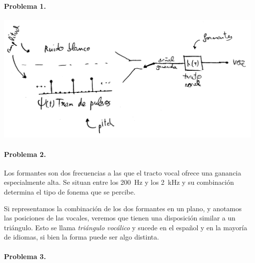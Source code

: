 

\newcommand{\nodenamebit}[1]{\textsf{#1}}
\newcommand{\nodenamesingle}[2]{\textsf{#1}_\textsf{#2}}
\newcommand{\nodenamerange}[3]{\textsf{#1}_\textsf{#2..#3}}


\startpage

\paragraph{Problema 1.} \hspace{1em}

\includegraphics[width=\textwidth]{T1-p1}

\finishpage


\startpage
\paragraph{Problema 2.}

Los formantes son dos frecuencias a las que el tracto vocal ofrece una ganancia
especialmente alta. Se situan entre los \SI{200}{\hertz} y los \SI{2}{\kilo\hertz}
y su combinación determina el tipo de fonema que se percibe.

Si representamos la combinación de los dos formantes en un plano, y anotamos
las posiciones de las vocales, veremos que tienen una disposición similar a un
triángulo. Esto se llama \emph{triángulo vocálico} y sucede en el español y en
la mayoría de idiomas, si bien la forma puede ser algo
distinta.

\finishpage


\startpage
\paragraph{Problema 3.}

